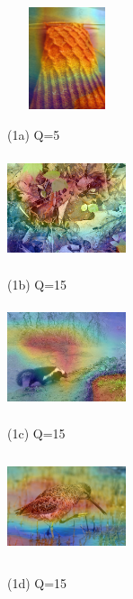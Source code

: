 \begin{figure}[!t]
	\begin{minipage}{0.2\linewidth}
		\centerline{\includegraphics[width=3.5cm, height=3.0cm]{figures/robust_figure1.png}}
		\centerline{(1a) Q=5}
	\end{minipage}
	\hfill
	\begin{minipage}{0.2\linewidth}
		\centerline{\includegraphics[width=3.5cm, height=3.0cm]{figures/robust_figure2.png}}
		\centerline{(1b) Q=15}
	\end{minipage}
	\hfill
	\begin{minipage}{0.2\linewidth}
		\centerline{\includegraphics[width=3.5cm, height=3.0cm]{figures/robust_figure3.png}}
		\centerline{(1c) Q=15}
	\end{minipage}
	\hfill
	\begin{minipage}{0.2\linewidth}
		\centerline{\includegraphics[width=3.5cm, height=3.0cm]{figures/robust_figure4.png}}
		\centerline{(1d) Q=15}
	\end{minipage}
	
	\vfill
	\vspace{0.4cm}
	

\end{figure}
